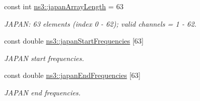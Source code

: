 \begin{DoxyCompactItemize}
const int \hyperlink{namespacens3_a156aac120ce816da1808c0b1a6bd2a01}{ns3\+::japan\+Array\+Length} = 63
\begin{DoxyCompactList}\small\item\em J\+A\+P\+AN\+: 63 elements (index 0 -\/ 62); valid channels = 1 -\/ 62. \end{DoxyCompactList}\item 
const double \hyperlink{namespacens3_a88b726d85e0f1f604a83f713b8e06105}{ns3\+::japan\+Start\+Frequencies} \mbox{[}63\mbox{]}
\begin{DoxyCompactList}\small\item\em J\+A\+P\+AN start frequencies. \end{DoxyCompactList}\item 
const double \hyperlink{namespacens3_aa98ca716c08dfdb6a374ee8d09d18119}{ns3\+::japan\+End\+Frequencies} \mbox{[}63\mbox{]}
\begin{DoxyCompactList}\small\item\em J\+A\+P\+AN end frequencies. \end{DoxyCompactList}\end{DoxyCompactItemize}
